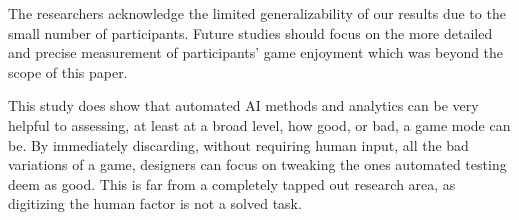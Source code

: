 The researchers acknowledge the limited generalizability of our results due to the small number of participants. Future studies should focus on the more detailed and precise measurement of participants’ game enjoyment which was beyond the scope of this paper.

This study does show that automated AI methods and analytics can be very helpful to assessing, at least at a broad level, how good, or bad, a game mode can be. By immediately discarding, without requiring human input, all the bad variations of a game, designers can focus on tweaking the ones automated testing deem as good. This is far from a completely tapped out research area, as digitizing the human factor is not a solved task.